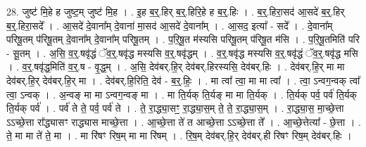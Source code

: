 \documentclass[17pt]{extarticle}
\begin{document}
28. जुष्ट॑ मि॒हे ह जुष्ट॒म् जुष्ट॑ मि॒ह । . इ॒ह ब॒र्॒.हिर् ब॒र्॒.हिरि॒हे ह ब॒र्॒.हिः । . ब॒र्॒.हिरा॒सद॑ आ॒सदे॑ ब॒र्॒.हिर् ब॒र्॒.हिरा॒सदे᳚ । . आ॒सदे॑ दे॒वाना᳚म् दे॒वाना॑ मा॒सद॑ आ॒सदे॑ दे॒वाना᳚म् । . आ॒सद॒ इत्या᳚ - सदे᳚ । . दे॒वाना᳚म् परिषू॒तम् प॑रिषू॒तम् दे॒वाना᳚म् दे॒वाना᳚म् परिषू॒तम् । . प॒रि॒षू॒त म॑स्यसि परिषू॒तम् प॑रिषू॒त म॑सि । . प॒रि॒षू॒तमिति॑ परि - सू॒तम् । . अ॒सि॒ व॒र्॒.षवृ॑द्धं ॅव॒र्॒.षवृ॑द्ध मस्यसि व॒र्॒.षवृ॑द्धम् । . व॒र्॒.षवृ॑द्ध मस्यसि व॒र्॒.षवृ॑द्धं ॅव॒र्॒.षवृ॑द्ध मसि । . व॒र्॒.षवृ॑द्ध॒मिति॑ व॒र्॒.ष - वृ॒द्ध॒म् । . अ॒सि॒ देव॑बर्.हि॒र् देव॑बर्.हिरस्यसि॒ देव॑बर्.हिः । . देव॑बर्.हि॒र् मा मा देव॑बर्.हि॒र् देव॑बर्.हि॒र् मा । . देव॑बर्.हि॒रिति॒ देव॑ - ब॒र्॒.हिः॒ । . मा त्वा᳚ त्वा॒ मा मा त्वा᳚ । . त्वा॒ ऽन्वग॒न्वक् त्वा᳚ त्वा॒ ऽन्वक् । . अ॒न्वङ् मा मा ऽन्वग॒न्वङ् मा । . मा ति॒र्यक् ति॒र्यङ् मा मा ति॒र्यक् । . ति॒र्यक् पर्व॒ पर्व॑ ति॒र्यक् ति॒र्यक् पर्व॑ । . पर्व॑ ते ते॒ पर्व॒ पर्व॑ ते । . ते॒ रा॒द्ध्या॒सꣳ॒॒ रा॒द्ध्या॒स॒म् ते॒ ते॒ रा॒द्ध्या॒स॒म् । . रा॒द्ध्या॒स॒ मा॒च्छे॒त्ता ऽऽच्छे॒त्ता रा᳚द्ध्यासꣳ राद्ध्यास माच्छे॒त्ता । . आ॒च्छे॒त्ता ते॑ त आच्छे॒त्ता ऽऽच्छे॒त्ता ते᳚ । . आ॒च्छे॒त्तेत्या᳚ - छे॒त्ता । . ते॒ मा मा ते॑ ते॒ मा । . मा रि॑षꣳ रिष॒म् मा मा रि॑षम् । . रि॒ष॒म् देव॑बर्.हि॒र् देव॑बर्.ही रिषꣳ रिष॒म् देव॑बर्.हिः । \newline
\end{document}

